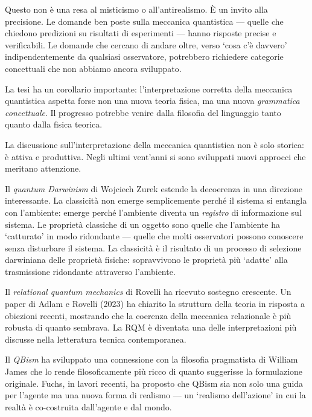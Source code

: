 \documentclass[12pt,a4paper,openany]{book}
\newcommand{\sezione}[1]{\vspace{1.2em}{\large\bfseries #1}\vspace{0.5em}\par}
\begin{document}
Questo non è una resa al misticismo o all'antirealismo. È un invito alla precisione. Le domande ben poste sulla meccanica quantistica — quelle che chiedono predizioni su risultati di esperimenti — hanno risposte precise e verificabili. Le domande che cercano di andare oltre, verso `cosa c'è davvero' indipendentemente da qualsiasi osservatore, potrebbero richiedere categorie concettuali che non abbiamo ancora sviluppato.

La tesi ha un corollario importante: l'interpretazione corretta della meccanica quantistica aspetta forse non una nuova teoria fisica, ma una nuova \textit{grammatica concettuale}. Il progresso potrebbe venire dalla filosofia del linguaggio tanto quanto dalla fisica teorica.

\sezione{Il futuro dell'interpretazione: oltre il paradigma attuale}

La discussione sull'interpretazione della meccanica quantistica non è solo storica: è attiva e produttiva. Negli ultimi vent'anni si sono sviluppati nuovi approcci che meritano attenzione.

Il \textit{quantum Darwinism} di Wojciech Zurek estende la decoerenza in una direzione interessante. La classicità non emerge semplicemente perché il sistema si entangla con l'ambiente: emerge perché l'ambiente diventa un \textit{registro} di informazione sul sistema. Le proprietà classiche di un oggetto sono quelle che l'ambiente ha `catturato' in modo ridondante --- quelle che molti osservatori possono conoscere senza disturbare il sistema. La classicità è il risultato di un processo di selezione darwiniana delle proprietà fisiche: sopravvivono le proprietà più `adatte' alla trasmissione ridondante attraverso l'ambiente.

Il \textit{relational quantum mechanics} di Rovelli ha ricevuto sostegno crescente. Un paper di Adlam e Rovelli (2023) ha chiarito la struttura della teoria in risposta a obiezioni recenti, mostrando che la coerenza della meccanica relazionale è più robusta di quanto sembrava. La RQM è diventata una delle interpretazioni più discusse nella letteratura tecnica contemporanea.

Il \textit{QBism} ha sviluppato una connessione con la filosofia pragmatista di William James che lo rende filosoficamente più ricco di quanto suggerisse la formulazione originale. Fuchs, in lavori recenti, ha proposto che QBism sia non solo una guida per l'agente ma una nuova forma di realismo --- un `realismo dell'azione' in cui la realtà è co-costruita dall'agente e dal mondo.
\end{document}
